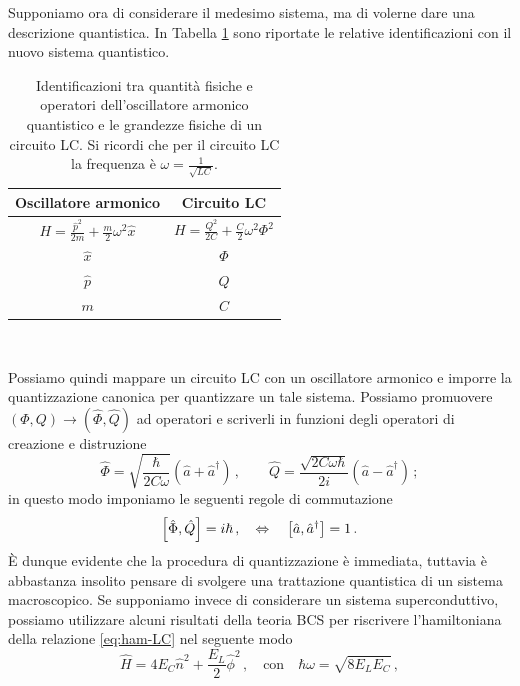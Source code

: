 \noindent Supponiamo ora di considerare il medesimo sistema, ma di volerne dare una descrizione quantistica. In Tabella \ref{tab:oa-lc} sono riportate le relative identificazioni con il nuovo sistema quantistico.
\begin{table}[H]
	\centering
    \begin{tabular}{c|c}
        \toprule
        Oscillatore armonico & Circuito LC \\
        \midrule
        $H=\frac{\hat{p}^2}{2m}+\frac{m}{2}\omega^2\hat{x}$ & $H=\frac{Q^2}{2C}+\frac C2 \omega^2\Phi^2$ \\
        \midrule
        $\hat{x}$ & $\Phi$ \\
        \hline
        $\hat{p}$ & $Q$ \\
        \hline
        $m$ & $C$ \\
        \bottomrule
    \end{tabular}\\
    \caption{Identificazioni tra quantità fisiche e operatori dell'oscillatore armonico quantistico e le grandezze fisiche di un circuito LC. Si ricordi che per il circuito LC la frequenza è $\omega = \frac{1}{\sqrt{LC}}$.}
    \label{tab:oa-lc}
\end{table}
\noindent Possiamo quindi mappare un circuito LC con un oscillatore armonico e imporre la quantizzazione canonica per quantizzare un tale sistema. Possiamo promuovere $(\Phi, Q) \to (\hat{\Phi}, \hat{Q})$ ad operatori e scriverli in funzioni degli operatori di creazione e distruzione
\begin{equation}\label{Phi_Q_oscill}
    \hat \Phi = \sqrt{\frac{\hbar}{2C\omega}}\left(\hat a + \hat a^\dagger\right) \, , \qquad \hat Q = \frac{\sqrt{2C \omega \hbar}}{2i}\left(\hat a - \hat a^\dagger\right) \, ;
\end{equation}
in questo modo imponiamo le seguenti regole di commutazione
\begin{equation*}
    \comm{\hat \Phi}{\hat Q}=i\hbar \, , \quad \Leftrightarrow \quad \comm{\hat a}{\hat a^\dagger}=1 \, .
\end{equation*}
È dunque evidente che la procedura di quantizzazione è immediata, tuttavia è abbastanza insolito pensare di svolgere una trattazione quantistica di un sistema macroscopico. 
\noindent Se supponiamo invece di considerare un sistema superconduttivo, possiamo utilizzare alcuni risultati della teoria BCS per riscrivere l'hamiltoniana della relazione \eqref{eq:ham-LC} nel seguente modo
\begin{equation}\label{eq:ham-oa-cQED}
    \hat H = 4E_C\hat n^2 + \frac{E_L}{2}\hat \phi^2 \, , \quad \text{con} \quad \hbar\omega=\sqrt{8E_LE_C} \, ,
\end{equation}
